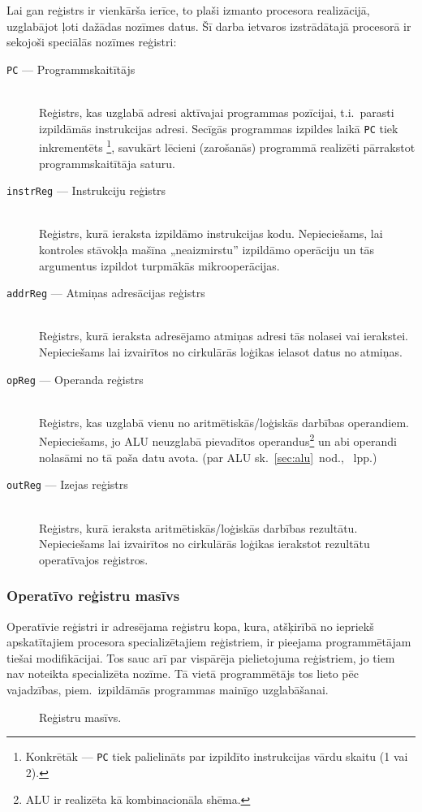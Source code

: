 	\pagebreak[3]
	Lai gan reģistrs ir vienkārša ierīce, to plaši izmanto procesora
	realizācijā, uzglabājot ļoti dažādas nozīmes datus.
	Šī darba ietvaros izstrādātajā procesorā ir sekojoši speciālās nozīmes reģistri:
	\begin{description}
		\item[\texttt{PC} — Programmskaitītājs] \hfill \\
			Reģistrs, kas uzglabā adresi aktīvajai programmas pozīcijai,
			t.i.~parasti izpildāmās instrukcijas adresi. Secīgās programmas
			izpildes laikā \texttt{PC} tiek inkrementēts%
			\footnote{Konkrētāk — \texttt{PC} tiek palielināts par
				izpildīto instrukcijas vārdu skaitu (1 vai 2).},
			savukārt lēcieni (zarošanās)
			programmā realizēti pārrakstot programmskaitītāja saturu.
		\item[\texttt{instrReg} — Instrukciju reģistrs] \hfill \\
			Reģistrs, kurā ieraksta izpildāmo instrukcijas kodu.
			Nepieciešams, lai kontroles stāvokļa mašīna „neaizmirstu”
			izpildāmo operāciju un tās argumentus izpildot
			turpmākās mikro\-operācijas.
		\item[\texttt{addrReg} — Atmiņas adresācijas reģistrs] \hfill \\
			Reģistrs, kurā ieraksta adresējamo atmiņas adresi tās nolasei
			vai ierakstei. Nepieciešams lai izvairītos no
			cirkulārās loģikas ielasot datus no atmiņas.
			\todo %
		\item[\texttt{opReg} — Operanda reģistrs] \hfill \\
			Reģistrs, kas uzglabā vienu no aritmētiskās/loģiskās darbības
			ope\-ran\-diem. Nepieciešams, jo ALU neuzglabā pievadītos
			operandus\footnote{ALU ir realizēta kā kombinacionāla shēma.}
			un abi operandi nolasāmi no tā paša datu avota.
			(par ALU sk.~\ref{sec:alu}~nod., \pageref{sec:alu}~lpp.)
		\item[\texttt{outReg} — Izejas reģistrs] \hfill \\
			Reģistrs, kurā ieraksta aritmētiskās/loģiskās darbības rezultātu.
			Nepieciešams lai izvairītos no cirkulārās loģikas
			ierakstot rezultātu operatīvajos reģistros.
	\end{description}

\pagebreak[3]
\subsubsection{Operatīvo reģistru masīvs}
	Operatīvie reģistri ir adresējama reģistru kopa, kura, atšķirībā no
	iepriekš apskatītajiem procesora specializētajiem reģistriem,
	ir pieejama	programmētājam tiešai modifikācijai.
	Tos sauc arī par vispārēja pielietojuma reģistriem, 
	jo tiem nav noteikta specializēta nozīme.
	Tā vietā programmētājs tos lieto pēc vajadzības, piem.~izpildāmās
	programmas mainīgo uzglabāšanai.
	\begin{figure}[th]
		\centering
		\def\svgscale{1.25}
		{\ttfamily\scriptsize}
		\caption{Reģistru masīvs.}
		\label{fig:regArray}
	\end{figure}
	
